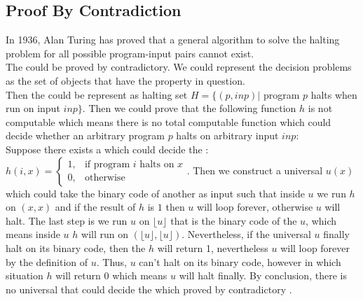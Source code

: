 \subsection{Proof By Contradiction}
In 1936, Alan Turing has proved that a general algorithm to solve the halting problem for all possible program-input pairs cannot exist.\cite{_halting_2015}\\
The  could be proved by contradictory. 
We could represent the decision problems as the set of objects that have the property in question.\\
Then the  could be represent as halting set $H = \{(p,inp)|$ program $p$ halts when run on input $inp\}$. 
Then we could prove that the following function $h$ is not computable which means there is no total computable function which could decide whether an arbitrary program $p$
halts on arbitrary input $inp$\cite{_computability_2015}:\\
\label{definition of U}Suppose there exists a  which could decide the : $h (i,x) = \begin{cases} 1, & \mbox{if program }i\mbox{ halts on } x \\ 0, & \mbox{otherwise}\end{cases}$.
Then we construct a universal  $u (x)$ which could take the binary code of another  as input such that inside $u$ we run $h$ on $(x, x)$ 
and if the result of $h$ is $1$ then $u$ will loop forever, otherwise $u$ will halt. The last step is we run $u$ on $\lfloor u\rfloor$ that is the binary code of
the  $u$, which means inside $u$  $h$ will run on $(\lfloor u\rfloor,\lfloor u\rfloor)$. 
Nevertheless, if the universal  $u$ finally halt on its binary code, then the  $h$ will return 1, nevertheless $u$ will loop forever by the definition of  $u$.
Thus, $u$ can’t halt on its binary code, however in which situation $h$ will return 0 which means $u$ will halt finally. 
By conclusion, there is no universal  that could decide the  which proved by contradictory \cite{_halting_2015}.
